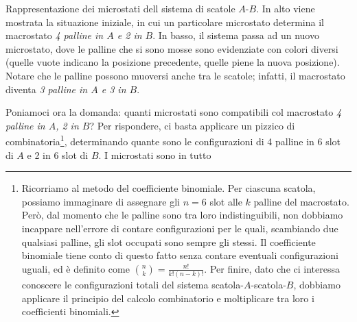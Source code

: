 \begin{marginfigure}
\begin{center}
\begin{minipage}{0.4\marginparwidth}
        \end{minipage}
    \end{center}
    \caption{Rappresentazione dei microstati dell sistema di scatole
    $A$-$B$. In alto viene mostrata la situazione iniziale, in cui
    un particolare microstato determina il macrostato \textit{4 palline
    in $A$ e 2 in $B$}. In basso, il sistema passa ad un nuovo microstato,
    dove le palline che si sono mosse sono evidenziate con colori diversi
    (quelle vuote indicano la posizione precedente, quelle piene la nuova
    posizione).
    Notare che le palline possono muoversi anche tra le scatole; infatti,
    il macrostato diventa \textit{3 palline in $A$ e 3 in $B$}.}
    \label{micromacro}
\end{marginfigure}


Poniamoci ora la domanda: quanti microstati sono compatibili
col macrostato \textit{4 palline in $A$, 2 in $B$}? Per rispondere,
ci basta applicare un pizzico di combinatoria\footnote{Ricorriamo
al metodo del coefficiente binomiale. Per ciascuna scatola, possiamo immaginare
di assegnare gli $n = 6$ slot alle $k$ palline del macrostato. Però, dal
momento che le palline sono tra loro indistinguibili, non dobbiamo incappare
nell'errore di contare configurazioni per le quali, scambiando due qualsiasi
palline, gli slot occupati sono sempre gli stessi. Il coefficiente binomiale
tiene conto di questo fatto senza contare eventuali configurazioni uguali,
ed è definito come $\binom{n}{k} = \frac{n!}{k!(n - k)!}$. Per finire, dato
che ci interessa conoscere le configurazioni totali del sistema scatola-$A$-scatola-$B$,
dobbiamo applicare il principio del calcolo combinatorio e moltiplicare tra
loro i coefficienti binomiali.},
determinando quante sono le configurazioni di 4 palline in 6 slot di $A$
e 2 in 6 slot di $B$. I microstati sono in tutto


